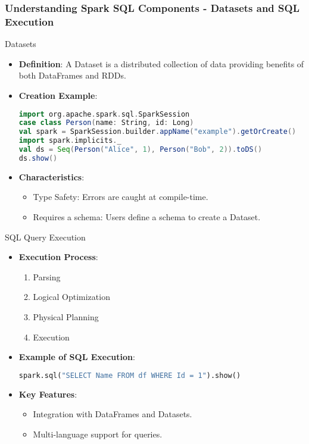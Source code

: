 \documentclass[aspectratio=169]{beamer}
\begin{document}
\begin{frame}[fragile]
    \frametitle{Understanding Spark SQL Components - Datasets and SQL Execution}
    \begin{block}{Datasets}
        \begin{itemize}
            \item \textbf{Definition}: A Dataset is a distributed collection of data providing benefits of both DataFrames and RDDs.
            \item \textbf{Creation Example}:
            \begin{lstlisting}[language=Scala]
import org.apache.spark.sql.SparkSession
case class Person(name: String, id: Long)
val spark = SparkSession.builder.appName("example").getOrCreate()
import spark.implicits._
val ds = Seq(Person("Alice", 1), Person("Bob", 2)).toDS()
ds.show()
            \end{lstlisting}
            \item \textbf{Characteristics}:
            \begin{itemize}
                \item Type Safety: Errors are caught at compile-time.
                \item Requires a schema: Users define a schema to create a Dataset.
            \end{itemize}
        \end{itemize}
    \end{block}
    
    \begin{block}{SQL Query Execution}
        \begin{itemize}
            \item \textbf{Execution Process}:
            \begin{enumerate}
                \item Parsing
                \item Logical Optimization
                \item Physical Planning
                \item Execution
            \end{enumerate}
            \item \textbf{Example of SQL Execution}:
            \begin{lstlisting}[language=Python]
spark.sql("SELECT Name FROM df WHERE Id = 1").show()
            \end{lstlisting}
            \item \textbf{Key Features}:
            \begin{itemize}
                \item Integration with DataFrames and Datasets.
                \item Multi-language support for queries.
            \end{itemize}
        \end{itemize}
    \end{block}
\end{frame}
\end{document}
